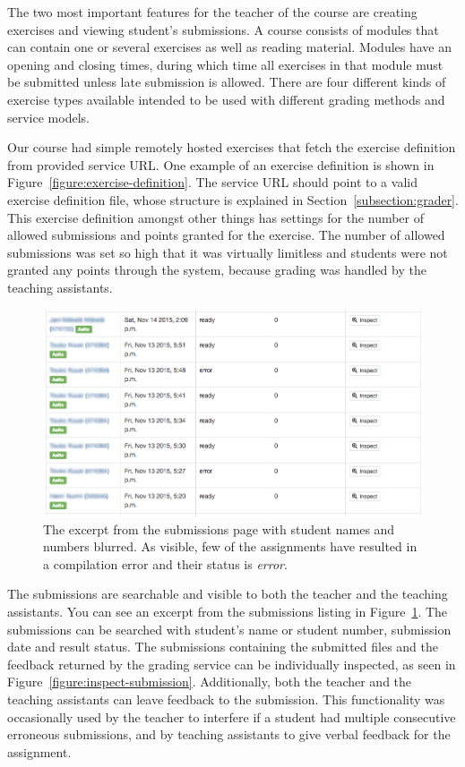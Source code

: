 The two most important features for the teacher of the course are creating exercises and viewing student's submissions. A course consists of modules that can contain one or several exercises as well as reading material. Modules have an opening and closing times, during which time all exercises in that module must be submitted unless late submission is allowed. There are four different kinds of exercise types available intended to be used with different grading methods and service models.

Our course had simple remotely hosted exercises that fetch the exercise definition from provided service URL. One example of an exercise definition is shown in Figure~\ref{figure:exercise-definition}. The service URL should point to a valid exercise definition file, whose structure is explained in Section~\ref{subsection:grader}. This exercise definition amongst other things has settings for the number of allowed submissions and points granted for the exercise. The number of allowed submissions was set so high that it was virtually limitless and students were not granted any points through the system, because grading was handled by the teaching assistants.

\begin{figure}[!b]
	\begin{center}
		\includegraphics[width=\textwidth]{images/submissions-view-3-mod.png}
	\end{center}
	\caption[asdf]{\small{The excerpt from the submissions page with student names and numbers blurred. As visible, few of the assignments have resulted in a compilation error and their status is \emph{error}.}}
	\label{figure:submissions-view}
\end{figure}

The submissions are searchable and visible to both the teacher and the teaching assistants. You can see an excerpt from the submissions listing in Figure~\ref{figure:submissions-view}. The submissions can be searched with student's name or student number, submission date and result status. The submissions containing the submitted files and the feedback returned by the grading service can be individually inspected, as seen in Figure~\ref{figure:inspect-submission}. Additionally, both the teacher and the teaching assistants can leave feedback to the submission. This functionality was occasionally used by the teacher to interfere if a student had multiple consecutive erroneous submissions, and by teaching assistants to give verbal feedback for the assignment.

